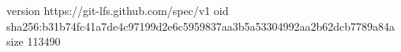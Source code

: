 version https://git-lfs.github.com/spec/v1
oid sha256:b31b74fc41a7de4c97199d2e6c5959837aa3b5a53304992aa2b62dcb7789a84a
size 113490
